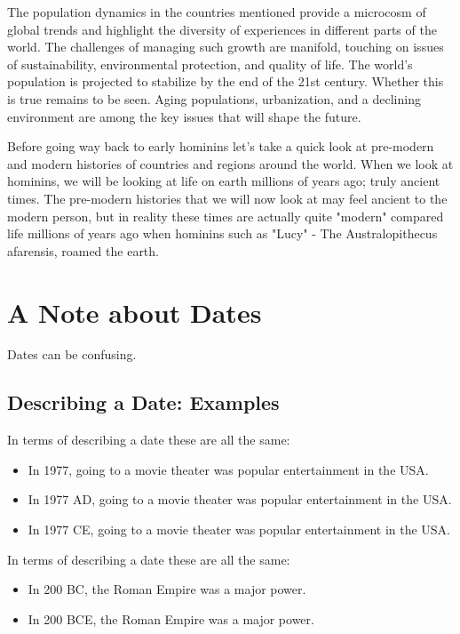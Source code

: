 \documentclass[a4paper,12pt]{book}
\begin{document}
The population dynamics in the countries mentioned provide a microcosm of global trends and highlight the diversity of experiences in different parts of the world. The challenges of managing such growth are manifold, touching on issues of sustainability, environmental protection, and quality of life.  The world's population is projected to stabilize by the end of the 21st century. Whether this is true remains to be seen. Aging populations, urbanization, and a declining environment are among the key issues that will shape the future. 

Before going way back to early hominins let's take a quick look at pre-modern and modern histories of countries and regions around the world. When we look at hominins, we will be looking at life on earth millions of years ago; truly ancient times. The pre-modern histories that we will now look at may feel ancient to the modern person, but in reality these times are actually quite "modern" compared life millions of years ago when hominins such as "Lucy" - The Australopithecus afarensis, roamed the earth. 

\section*{A Note about Dates}
Dates can be confusing.

\subsection*{Describing a Date: Examples}
In terms of describing a date these are all the same:

\begin{itemize}
    \item In 1977, going to a movie theater was popular entertainment in the USA.
    \item In 1977 AD, going to a movie theater was popular entertainment in the USA.
    \item In 1977 CE, going to a movie theater was popular entertainment in the USA.
\end{itemize}

In terms of describing a date these are all the same:

\begin{itemize}
    \item In 200 BC, the Roman Empire was a major power.
    \item In 200 BCE, the Roman Empire was a major power.
\end{itemize}
\end{document}
